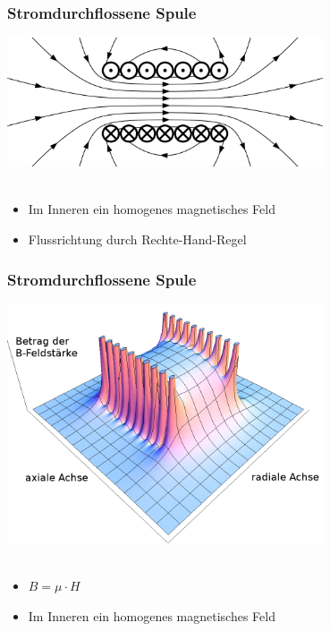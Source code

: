 \begin{frame}
    \frametitle{Stromdurchflossene Spule}
    \begin{center}
		\includegraphics[width=0.7\textwidth,height=.6\textheight,keepaspectratio]{a08/H-Feld.png}\\
		{\tiny \hyperlink{refs}{\cite{wm}}} \\[1em]
		\begin{itemize}
		\item Im Inneren ein homogenes magnetisches Feld
		\item Flussrichtung durch Rechte-Hand-Regel
		\end{itemize}
	\end{center}
\end{frame}

\begin{frame}
    \frametitle{Stromdurchflossene Spule}
    \begin{center}
		\includegraphics[width=0.7\textwidth,height=.6\textheight,keepaspectratio]{a08/3-D_HFeld.png}\\
		\tiny \hyperlink{refs}{\cite{wm}} \\[1em] \large
		\begin{itemize}
		\item $B = \mu \cdot H$
		\item Im Inneren ein homogenes magnetisches Feld
		\end{itemize}
	\end{center}
\end{frame}

